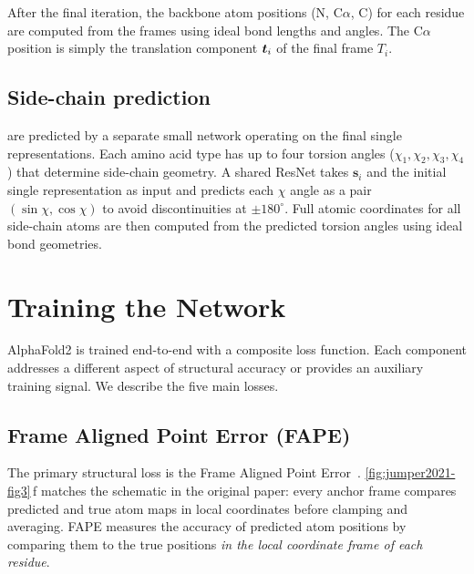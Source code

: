 After the final iteration, the backbone atom positions (N, C$\alpha$, C) for each residue are computed from the frames using ideal bond lengths and angles.
The C$\alpha$ position is simply the translation component $\bm{t}_i$ of the final frame $T_i$.

\subsection*{Side-chain prediction}
\label{sec:af2-sidechain}

 are predicted by a separate small network operating on the final single representations.
Each amino acid type has up to four torsion angles ($\chi_1, \chi_2, \chi_3, \chi_4$) that determine side-chain geometry.
A shared ResNet takes $\bm{s}_i$ and the initial single representation as input and predicts each $\chi$ angle as a pair $(\sin\chi, \cos\chi)$ to avoid discontinuities at $\pm 180^\circ$.
Full atomic coordinates for all side-chain atoms are then computed from the predicted torsion angles using ideal bond geometries.


\section{Training the Network}
\label{sec:af2-losses}

AlphaFold2 is trained end-to-end with a composite loss function.
Each component addresses a different aspect of structural accuracy or provides an auxiliary training signal.
We describe the five main losses.

\subsection*{Frame Aligned Point Error (FAPE)}
\label{sec:af2-fape}

The primary structural loss is the Frame Aligned Point Error~\cite{jumper2021}.
\cref{fig:jumper2021-fig3}\,f matches the schematic in the original paper: every anchor frame compares predicted and true atom maps in local coordinates before clamping and averaging.
FAPE measures the accuracy of predicted atom positions by comparing them to the true positions \emph{in the local coordinate frame of each residue}.

